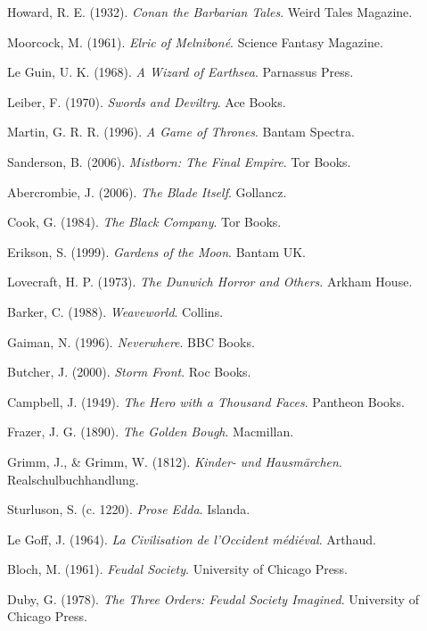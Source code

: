Howard, R. E. (1932).
\textit{Conan the Barbarian Tales}.
Weird Tales Magazine.

Moorcock, M. (1961).
\textit{Elric of Melniboné}.
Science Fantasy Magazine.

Le Guin, U. K. (1968).
\textit{A Wizard of Earthsea}.
Parnassus Press.

Leiber, F. (1970).
\textit{Swords and Deviltry}.
Ace Books.

Martin, G. R. R. (1996).
\textit{A Game of Thrones}.
Bantam Spectra.

Sanderson, B. (2006).
\textit{Mistborn: The Final Empire}.
Tor Books.

Abercrombie, J. (2006).
\textit{The Blade Itself}.
Gollancz.

Cook, G. (1984).
\textit{The Black Company}.
Tor Books.

Erikson, S. (1999).
\textit{Gardens of the Moon}.
Bantam UK.

Lovecraft, H. P. (1973).
\textit{The Dunwich Horror and Others}.
Arkham House.

Barker, C. (1988).
\textit{Weaveworld}.
Collins.

Gaiman, N. (1996).
\textit{Neverwhere}.
BBC Books.

Butcher, J. (2000).
\textit{Storm Front}.
Roc Books.

Campbell, J. (1949).
\textit{The Hero with a Thousand Faces}.
Pantheon Books.

Frazer, J. G. (1890).
\textit{The Golden Bough}.
Macmillan.

Grimm, J., \& Grimm, W. (1812).
\textit{Kinder- und Hausmärchen}.
Realschulbuchhandlung.

Sturluson, S. (c. 1220).
\textit{Prose Edda}.
Islanda.

Le Goff, J. (1964).
\textit{La Civilisation de l'Occident médiéval}.
Arthaud.

Bloch, M. (1961).
\textit{Feudal Society}.
University of Chicago Press.

Duby, G. (1978).
\textit{The Three Orders: Feudal Society Imagined}.
University of Chicago Press.

